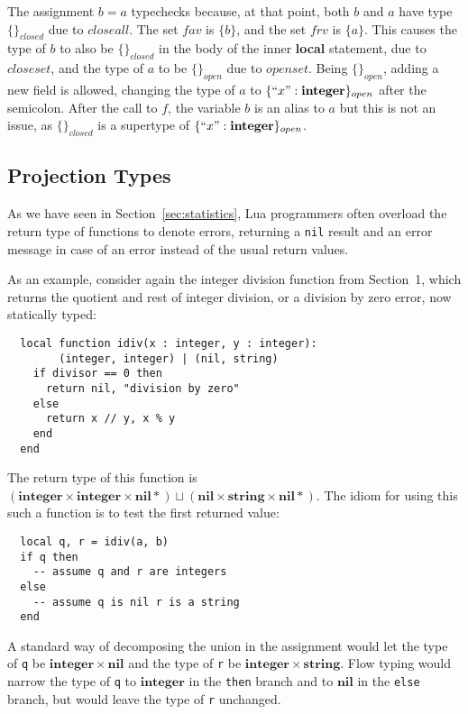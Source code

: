 \documentclass{sigplanconf}
\newcommand{\Nil}{\mathbf{nil}}
\newcommand{\Integer}{\mathbf{integer}}
\newcommand{\String}{\mathbf{string}}
\begin{document}
The assignment $b=a$ typechecks because, at that point, 
both $b$ and $a$ have type $\{\}_{closed}$ due to $closeall$.
The set $fav$ is $\{b\}$, and the set $frv$ is $\{a\}$.
This causes the type of $b$ to also be $\{\}_{closed}$
in the body of the inner {\bf local} statement, due to $closeset$, and the type of $a$ to be $\{\}_{open}$ due
to $openset$. Being $\{\}_{open}$, adding a new field
is allowed, changing the type of $a$ to $\{``x": \Integer\}_{open}$ after the semicolon. After the call to
$f$, the variable $b$ is an alias to $a$ but this is not
an issue, as $\{\}_{closed}$ is a supertype of $\{``x": \Integer\}_{open}$.

\subsection{Projection Types}
\label{sec:projections}

As we have seen in Section~\ref{sec:statistics}, Lua
programmers often overload the return type of functions
to denote errors, returning a {\tt nil} result and
an error message in case of an error instead of the
usual return values.

As an example, consider again the integer division function
from Section~1, which returns the quotient and rest of integer
division, or a division by zero error, now statically typed:
\begin{verbatim}
  local function idiv(x : integer, y : integer):
        (integer, integer) | (nil, string)
    if divisor == 0 then
      return nil, "division by zero"
    else
      return x // y, x % y
    end 
  end
\end{verbatim}

The return type of this function is
$(\Integer \times \Integer \times \Nil*) \sqcup (\Nil \times \String \times \Nil{*})$. The idiom for using this such
a function is to test the first returned value:
\begin{verbatim}
  local q, r = idiv(a, b)
  if q then
    -- assume q and r are integers
  else 
    -- assume q is nil r is a string
  end
\end{verbatim}

A standard way of decomposing the union in the assignment
would let the type of {\tt q} be $\Integer \times \Nil$ and
the type of {\tt r} be $\Integer \times \String$. Flow typing
would narrow the type of {\tt q} to $\Integer$ in the {\tt then}
branch and to $\Nil$ in the {\tt else} branch, but would
leave the type of {\tt r} unchanged.
\end{document}
